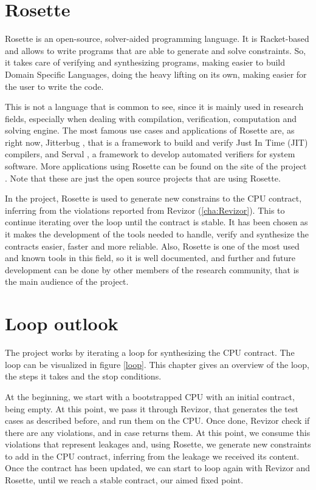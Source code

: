 \section{Rosette}
\label{cha:Rosette} Rosette is an open-source, solver-aided programming language.
It is Racket-based and allows to write programs that are able to generate and solve
constraints. So, it takes care of verifying and synthesizing programs, making
easier to build Domain Specific Languages, doing the heavy lifting on its own,
making easier for the user to write the code.

This is not a language that is common to see, since it is mainly used in research
fields, especially when dealing with compilation, verification, computation and
solving engine. The most famous use cases and applications of Rosette are, as
right now, Jitterbug \cite{jit}, that is a framework to build and verify Just In
Time (JIT) compilers, and Serval \cite{ser}, a framework to develop automated
verifiers for system software. More applications using Rosette can be found on the
site of the project \cite{ros}. Note that these are just the open source
projects that are using Rosette.

In the project, Rosette is used to generate new constrains to the CPU contract,
inferring from the violations reported from Revizor (\ref{cha:Revizor}). This to
continue iterating over the loop until the contract is stable. It has been
chosen as it makes the development of the tools needed to handle, verify and synthesize
the contracts easier, faster and more reliable. Also, Rosette is one of the most
used and known tools in this field, so it is well documented, and further and
future development can be done by other members of the research community, that is
the main audience of the project.

\section{Loop outlook}
\label{cha: Loop outlook} The project works by iterating a loop for synthesizing
the CPU contract. The loop can be visualized in figure \ref{loop}. This chapter gives
an overview of the loop, the steps it takes and the stop conditions.

At the beginning, we start with a bootstrapped CPU with an initial contract,
being empty. At this point, we pass it through Revizor, that generates the test cases
as described before, and run them on the CPU. Once done, Revizor check if there
are any violations, and in case returns them. At this point, we consume this violations
that represent leakages and, using Rosette, we generate new constraints to add in
the CPU contract, inferring from the leakage we received its content. Once the contract
has been updated, we can start to loop again with Revizor and Rosette, until we reach
a stable contract, our aimed fixed point.

